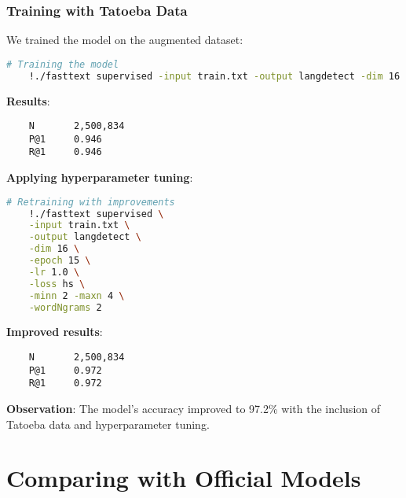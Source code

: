 \documentclass{beamer}
\begin{document}
\begin{frame}[fragile]
    \frametitle{Training with Tatoeba Data}
    We trained the model on the augmented dataset:

    \begin{lstlisting}[language=bash]
    # Training the model
    !./fasttext supervised -input train.txt -output langdetect -dim 16
    \end{lstlisting}

    \textbf{Results}:

    \begin{lstlisting}
    N       2,500,834
    P@1     0.946
    R@1     0.946
    \end{lstlisting}

    \textbf{Applying hyperparameter tuning}:

    \begin{lstlisting}[language=bash]
    # Retraining with improvements
    !./fasttext supervised \
    -input train.txt \
    -output langdetect \
    -dim 16 \
    -epoch 15 \
    -lr 1.0 \
    -loss hs \
    -minn 2 -maxn 4 \
    -wordNgrams 2
    \end{lstlisting}

    \textbf{Improved results}:

    \begin{lstlisting}
    N       2,500,834
    P@1     0.972
    R@1     0.972
    \end{lstlisting}

    \textbf{Observation}: The model's accuracy improved to 97.2\% with the inclusion of Tatoeba data and hyperparameter tuning.
\end{frame}

\section{Comparing with Official Models}
\end{document}
